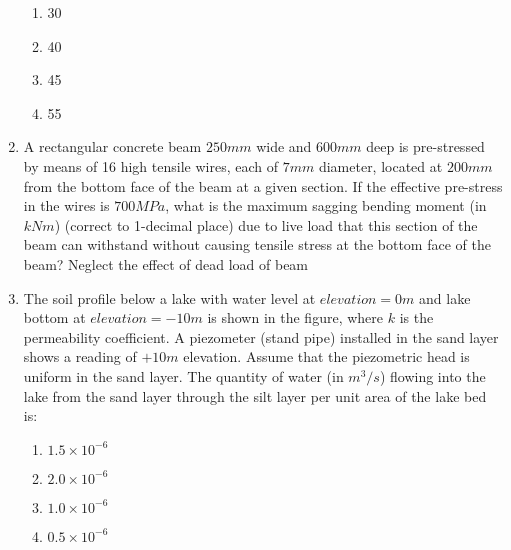 \documentclass[journal]{IEEEtran}
\begin{document}
\begin{enumerate}
		\begin{enumerate}
			\item 30
			\item 40
			\item 45
			\item 55
		\end{enumerate}
	\item
	A rectangular concrete beam $250 mm$ wide and $600 mm$ deep is pre-stressed by means of 16 high tensile wires, each of $7 mm$ diameter, located at $200 mm$ from the bottom face of the beam at a given section. If the effective pre-stress in the wires is $700 MPa$, what is the maximum sagging bending moment (in $kNm$) (correct to 1-decimal place) due to live load that this section of the beam can withstand without causing tensile stress at the bottom face of the beam? Neglect the effect of dead load of beam
	\item
	The soil profile below a lake with water level at $elevation = 0m$ and lake bottom at $elevation = -10 m$ is shown in the figure, where $k$ is the permeability coefficient. A piezometer (stand pipe) installed in the sand layer shows a reading of $+10 m$ elevation. Assume that the piezometric head is uniform in the sand layer. The quantity of water (in $m^3/s$) flowing into the lake from the sand layer through the silt layer per unit area of the lake bed is:
	\begin{figure}[H]
    		\centering
    		
    		\caption{}
    		\label{36}
	\end{figure}
		\begin{enumerate}
			\item $1.5 \times 10^{-6}$
			\item $2.0 \times 10^{-6}$
			\item $1.0 \times 10^{-6}$
			\item $0.5 \times 10^{-6}$
		\end{enumerate}


\end{enumerate}
\end{document}

